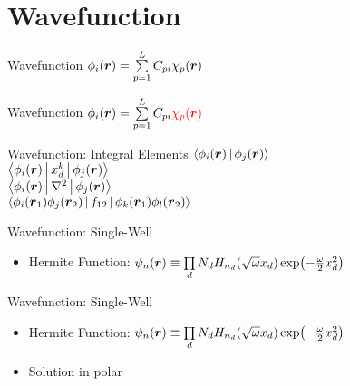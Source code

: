 \documentclass[10pt, t, xcolor=dvipsnames]{beamer}
\begin{document}
{{\section{Wavefunction}

{
\begin{frame}[standout]{Wavefunction}
    $\phi_i(\bm{{r}}) = \sum\limits^L_{p=1} C_{pi}\chi_p(\bm{{r}})$
\end{frame}

{
\begin{frame}[standout]{Wavefunction}
    $\phi_i(\bm{{r}}) = \sum\limits^L_{p=1} C_{pi}\color{red}{\chi_p(\bm{{r}})}$
\end{frame}

{
\begin{frame}[standout]{Wavefunction: Integral Elements}
    $\Braket{\phi_i(\bm{{r}})|\phi_j(\bm{{r}})}$ \\ \vsp\vsp\vsp\vsp
    $\Braket{\phi_i(\bm{{r}})|x^k_d|\phi_j(\bm{{r}})}$ \\ \vsp\vsp\vsp\vsp
    $\Braket{\phi_i(\bm{{r}})|\nabla^2|\phi_j(\bm{{r}})}$ \\ \vsp\vsp\vsp\vsp
    $\Braket{\phi_i(\bm{{r}}_1)\phi_j(\bm{{r}}_2)|f_{12}|\phi_k(\bm{{r}}_1)\phi_l(\bm{{r}}_2)}$ \\
\end{frame}

\begin{frame}[fragile]{Wavefunction: Single-Well}
    \begin{itemize}
        \item Hermite Function: $\psi_n(\bm{{r}}) \equiv \prod\limits_d N_d
            H_{n_d}(\sqrt{\omega}x_d)\exp(-\frac{\omega}{2}x^2_d)$
    \end{itemize}
\end{frame}

\begin{frame}[fragile]{Wavefunction: Single-Well}
    \begin{itemize}
        \item Hermite Function: $\psi_n(\bm{{r}}) \equiv \prod\limits_d N_d
            H_{n_d}(\sqrt{\omega}x_d)\exp(-\frac{\omega}{2}x^2_d)$
        \item Solution in polar
    \end{itemize}
\end{frame}

}}}}}
\end{document}

